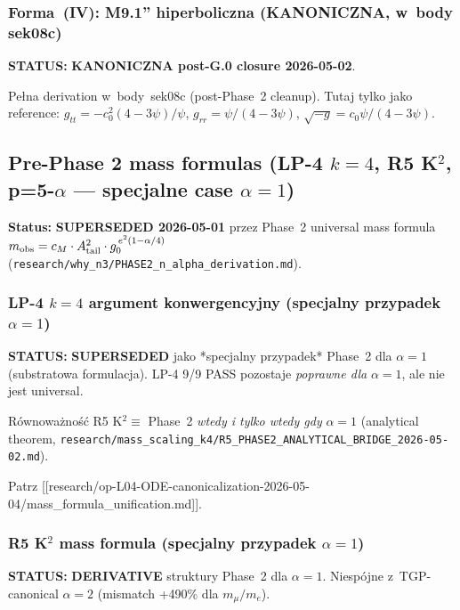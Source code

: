 \subsubsection{Forma~(IV): M9.1'' hiperboliczna (KANONICZNA, w~body sek08c)}%
\label{app:metric-form-IV-canonical-ref}

\textbf{STATUS:} \textbf{KANONICZNA post-G.0 closure 2026-05-02}.

Pe\l{}na derivation w~body~sek08c (post-Phase~2 cleanup). Tutaj tylko
jako reference: $g_{tt} = -c_0^2(4-3\psi)/\psi$,
$g_{rr} = \psi/(4-3\psi)$, $\sqrt{-g} = c_0\psi/(4-3\psi)$.

\subsection{Pre-Phase 2 mass formulas
(LP-4 $k=4$, R5 K$^2$, p=5-$\alpha$ — specjalne case $\alpha=1$)}%
\label{app:pivot-mass-formulas}

\textbf{Status:} \textbf{SUPERSEDED 2026-05-01} przez
Phase~2 universal mass formula
$m_{\rm obs} = c_M \cdot A_{\rm tail}^2 \cdot g_0^{\,e^2(1-\alpha/4)}$
(\texttt{research/why\_n3/PHASE2\_n\_alpha\_derivation.md}).

\subsubsection{LP-4 $k=4$ argument konwergencyjny
(specjalny przypadek $\alpha=1$)}\label{app:mass-formula-LP4}

\textbf{STATUS:} \textbf{SUPERSEDED} jako *specjalny przypadek*
Phase~2 dla $\alpha=1$ (substratowa formulacja). LP-4 9/9 PASS pozostaje
\emph{poprawne dla} $\alpha=1$, ale nie jest universal.

R\'ownowa\.zno\'s\'c R5 K$^2 \equiv$ Phase~2 \emph{wtedy i tylko wtedy
gdy} $\alpha=1$ (analytical theorem,
\texttt{research/mass\_scaling\_k4/R5\_PHASE2\_ANALYTICAL\_BRIDGE\_2026-05-02.md}).

Patrz [[research/op-L04-ODE-canonicalization-2026-05-04/mass\_formula\_unification.md]].

\subsubsection{R5 K$^2$ mass formula (specjalny przypadek $\alpha=1$)}%
\label{app:mass-formula-R5}

\textbf{STATUS:} \textbf{DERIVATIVE} struktury Phase~2 dla $\alpha=1$.
Niespójne z~TGP-canonical $\alpha=2$ (mismatch +490\% dla
$m_\mu/m_e$).

